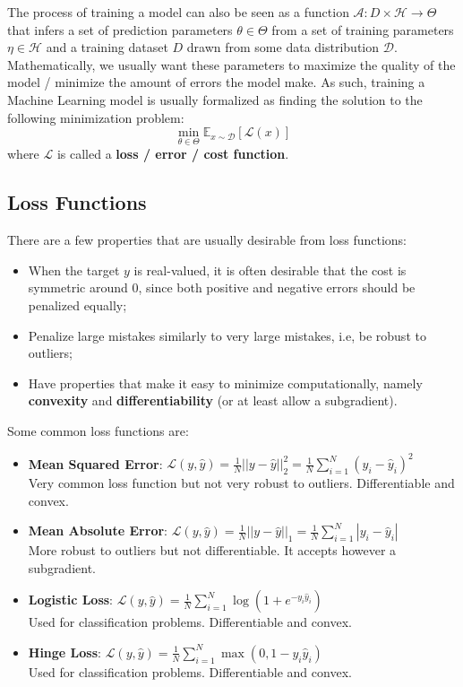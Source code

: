 \documentclass{article}
\newcommand{\E}{\mathbb{E}}
\newcommand{\loss}{\mathcal{L}}
\begin{document}
The process of training a model can also be seen as a function $\mathcal{A} : D \times \mathcal{H} \to \Theta$ that infers a set of prediction parameters $\theta \in \Theta$ from a set of training parameters $\eta \in \mathcal{H}$ and a training dataset $D$ drawn from some data distribution $\mathcal{D}$.
Mathematically, we usually want these parameters to maximize the quality of the model / minimize the amount of errors the model make.
As such, training a Machine Learning model is usually formalized as finding the solution to  the following minimization problem:
$$
\min_{\theta \in \Theta} \E_{x \sim \mathcal{D}} \left[ \loss(x) \right]
$$
where $\loss$ is called a \textbf{loss / error / cost function}.

\subsection{Loss Functions}

There are a few properties that are usually desirable from loss functions:
\begin{itemize}
    \item When the target $y$ is real-valued, it is often desirable that the cost is symmetric around 0, since both positive and negative errors should be penalized equally;
    \item Penalize large mistakes similarly to very large mistakes, i.e, be robust to outliers;
    \item Have properties that make it easy to minimize computationally, namely \textbf{convexity} and \textbf{differentiability} (or at least allow a subgradient).
\end{itemize}

Some common loss functions are:
\begin{itemize}
    \item \textbf{Mean Squared Error}: 
	$\loss(y, \hat{y}) = \frac{1}{N} ||y - \hat{y}||_2^2 = \frac{1}{N} \sum_{i=1}^N (y_i - \hat{y}_i)^2$\\
	Very common loss function but not very robust to outliers. Differentiable and convex.
    \item \textbf{Mean Absolute Error}: 
	$\loss(y, \hat{y}) = \frac{1}{N} ||y - \hat{y}||_1 = \frac{1}{N} \sum_{i=1}^N |y_i - \hat{y}_i|$\\
	More robust to outliers but not differentiable. It accepts however a subgradient.
	\item \textbf{Logistic Loss}:
	$\loss(y, \hat{y}) = \frac{1}{N} \sum_{i=1}^N \log(1 + e^{-y_i \hat{y}_i})$\\
	Used for classification problems. Differentiable and convex.
	\item \textbf{Hinge Loss}:
	$\loss(y, \hat{y}) = \frac{1}{N} \sum_{i=1}^N \max(0, 1 - y_i \hat{y}_i)$\\
	Used for classification problems. Differentiable and convex.
\end{itemize}
\end{document}
